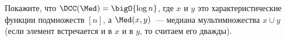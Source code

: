 Покажите, что $\DCC(\Med) = \bigO{\log n}$, где $x$ и $y$ это характеристические функции подмножеств
$[n]$, а $\Med(x, y)$~--- медиана мультимножества $x \cup y$ (если элемент встречается и в $x$ и в $y$,
то считаем его дважды).